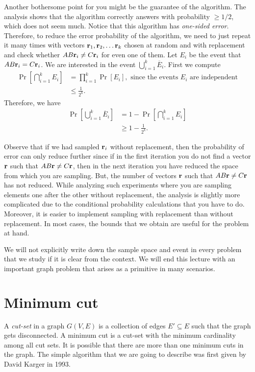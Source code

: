 Another bothersome point for you might be the guarantee of the algorithm. The analysis shows that the algorithm correctly answers with probability $\geq 1/2$, which does not seem much. Notice that this algorithm has \textit{one-sided error}. Therefore, to reduce the error probability of the algorithm, we need to just repeat it many times with vectors $\mathbf{r}_1, \mathbf{r}_2, \ldots \mathbf{r}_k$ chosen at random and with replacement and check whether $AB\mathbf{r}_i \neq C\mathbf{r}_i$ for even one of them. Let $E_i$ be the event that $AB\mathbf{r}_i = C\mathbf{r}_i$. We are interested in the event $\bigcup_{i=1}^{k} \overline{E}_i$. First we compute
\begin{align*}
	\Pr\left[ \bigcap_{i=1}^k E_i \right] &= \prod_{i=1}^k \Pr[E_i], \text{ since the events $E_i$ are independent} \\
	&\leq \frac{1}{2^k}.
\end{align*} 
Therefore, we have
\begin{align*}
	\Pr\left[ \bigcup_{i=1}^k \overline{E}_i \right] &= 1 - \Pr\left[ \bigcap_{i=1}^k E_i \right]\\
	&\geq 1 - \frac{1}{2^k}.
\end{align*}

Observe that if we had sampled $\mathbf{r}_i$ without replacement, then the probability of error can only reduce further since if in the first iteration you do not find a vector $\mathbf{r}$ such that $AB\mathbf{r}\neq C\mathbf{r}$, then in the next iteration you have reduced the space from which you are sampling. But, the number of vectors $\mathbf{r}$ such that $AB\mathbf{r} \neq C\mathbf{r}$ has not reduced. While analyzing such experiments where you are sampling elements one after the other without replacement, the analysis is slightly more complicated due to the conditional probability calculations that you have to do. Moreover, it is easier to implement sampling with replacement than without replacement. In most cases, the bounds that we obtain are useful for the problem at hand. 

We will not explicitly write down the sample space and event in every problem that we study if it is clear from the context. We will end this lecture with an important graph problem that arises as a primitive in many scenarios.

\section{Minimum cut}

A \emph{cut-set} in a graph $G(V,E)$ is a collection of edges $E' \subseteq E$ such that the graph gets disconnected. A minimum cut is a cut-set with the minimum cardinality among all cut sets. It is possible that there are more than one minimum cuts in the graph. The simple algorithm that we are going to describe was first given by David Karger in 1993.

